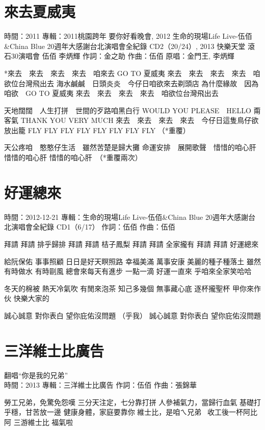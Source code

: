 \documentclass[UTF8,a4paper,oneside,twocolumn,12pt]{ctexbook}
\newcommand{\infopair}[2]{\textbullet #1：#2}
\newcommand{\zc}[1][伍佰]{\infopair{作詞}{#1}}
\newcommand{\zq}[1][伍佰]{\infopair{作曲}{#1}}
\newcommand{\zj}[1]{\infopair{專輯}{#1}}
\newcommand{\yc}[1]{\infopair{原唱}{#1}}
\newcommand{\sj}[1]{\infopair{時間}{#1}}
\newenvironment{info}{\begin{flushleft}\kaishu
	}
	{\end{flushleft}\normalsize\yahei\par}
\newenvironment{lyric}{
	}
{}
\begin{document}
\section{來去夏威夷} %
\begin{info}
	\sj{2011}
	\zj{2011桃園跨年 要你好看晚會, 2012 生命的現場Life Live-伍佰\&China Blue 20週年大感謝台北演唱會全紀錄 CD2（20/24）, 2013 快樂天堂 滾石30演唱會 伍佰 李炳輝}
	\zc[金之助] %
	\zq
	\yc{金門王, 李炳輝}
\end{info}
\begin{lyric}
	*來去　來去　來去　來去　咱來去 GO TO 夏威夷
	來去　來去　來去　來去　咱欲位台灣飛出去
	海水鹹鹹　日頭炎炎　今仔日咱欲來去剃頭店
	為什麼緣故　因為咱欲　GO TO 夏威夷
	來去　來去　來去　來去　咱欲位台灣飛出去

	天地闊闊　人生打拼　世間的歹路咱黑白行
	WOULD YOU PLEASE　HELLO 甭客氣
	THANK YOU VERY MUCH
	來去　來去　來去　來去　今仔日這隻鳥仔欲放出籠
	FLY FLY FLY FLY FLY FLY FLY FLY （*重覆）

	天公疼咱　憨憨仔生活　雖然苦楚是歸大攤
	命運安排　展開歌聲　惜惜的咱心肝　惜惜的咱心肝
	惜惜的咱心肝　（*重覆兩次）
\end{lyric}

\section{好運總來}
\begin{info}
	\sj{2012-12-21}
	\zj{生命的現場Life Live-伍佰\&China Blue 20週年大感謝台北演唱會全紀錄 CD1（6/17）}
	\zc
	\zq
\end{info}
\begin{lyric}
	拜請 拜請 排乎歸排
	拜請 拜請 桔子鳳梨
	拜請 拜請 全家攏有
	拜請 拜請 好運總來

	給阮保佑 事事照顧 日日是好天瞑照路
	幸福美滿 萬事安康 美麗的種子種落土
	雖然有時做水 有時剾風 總會來每天有進步
	一點一滴 好運一直來 乎咱來全家笑哈哈

	冬天的棉被 熱天冷氣吹 有閒來泡茶 知己多幾個
	無事藏心底 逐杯攏聖杯 甲你來作伙 快樂大家的

	誠心誠意 對你表白 望你庇佑沒問題
	（乎我）
	誠心誠意 對你表白 望你庇佑沒問題
\end{lyric}

\section{三洋維士比廣告} %
\begin{info}
	翻唱“你是我的兄弟” \\

	\sj{2013}
	\zj{三洋維士比廣告}
	\zc[伍佰]
	\zq[張錦華]
\end{info}
\begin{lyric}
	勞工兄弟，免驚免怨嘆
	三分天注定，七分靠打拼
	人參補氣力，當歸行血氣
	基礎打乎穩，甘苦放一邊
	健康身體，家庭要靠你
	維士比，是咱ㄟ兄弟~
	收工後一杯阿比阿 三游維士比 福氣啦
\end{lyric}
\end{document}
